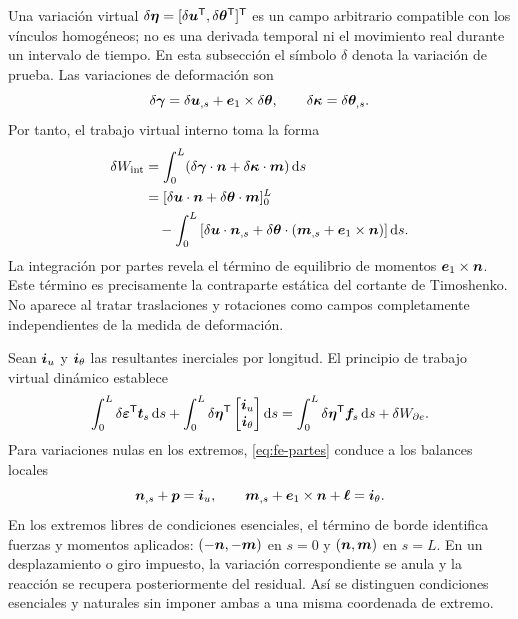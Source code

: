 Una variación virtual $\delta\bm{\eta}=[\delta\bm{u}^{\mathsf T},
\delta\bm{\theta}^{\mathsf T}]^{\mathsf T}$ es un campo arbitrario compatible con los
vínculos homogéneos; no es una derivada temporal ni el movimiento real durante
un intervalo de tiempo. En esta subsección el símbolo $\delta$ denota la
variación de prueba. Las variaciones de deformación son
\begin{equation}
 \delta\bm{\gamma}=\delta\bm{u}_{,s}
 +\bm{e}_1\times\delta\bm{\theta},
 \qquad
 \delta\bm{\kappa}=\delta\bm{\theta}_{,s}.
\end{equation}
Por tanto, el trabajo virtual interno toma la forma
\begin{align}
 \delta W_{\rm int}
 &=\int_0^L(\delta\bm{\gamma}\cdot\bm{n}
       +\delta\bm{\kappa}\cdot\bm{m})\,\mathrm d s\nonumber\\
 &=[\delta\bm{u}\cdot\bm{n}+
       \delta\bm{\theta}\cdot\bm{m}]_0^L\nonumber\\
 &\quad-\int_0^L\left[\delta\bm{u}\cdot\bm{n}_{,s}
       +\delta\bm{\theta}\cdot
       (\bm{m}_{,s}+\bm{e}_1\times\bm{n})\right]\mathrm d s.
 \label{eq:fe-partes}
\end{align}
La integración por partes revela el término de equilibrio de momentos
$\bm{e}_1\times\bm{n}$. Este término es precisamente la contraparte estática
del cortante de Timoshenko. No aparece al tratar traslaciones y rotaciones
como campos completamente independientes de la medida de deformación.

Sean $\bm{i}_u$ y $\bm{i}_\theta$ las resultantes inerciales por longitud.
El principio de trabajo virtual dinámico establece
\begin{equation}
 \int_0^L\delta\bm{\varepsilon}^{\mathsf T}\bm{t}_s\,\mathrm d s
 +\int_0^L\delta\bm{\eta}^{\mathsf T}
        \begin{bmatrix}\bm{i}_u\\\bm{i}_\theta\end{bmatrix}\mathrm d s
 =\int_0^L\delta\bm{\eta}^{\mathsf T}\bm{f}_s\,\mathrm d s
 +\delta W_{\partial e}.
 \label{eq:fe-debil}
\end{equation}
Para variaciones nulas en los extremos, \eqref{eq:fe-partes} conduce a los
balances locales
\begin{equation}
 \bm{n}_{,s}+\bm{p}=\bm{i}_u,\qquad
 \bm{m}_{,s}+\bm{e}_1\times\bm{n}+\bm{\ell}=\bm{i}_\theta.
\end{equation}
En los extremos libres de condiciones esenciales, el término de borde
identifica fuerzas y momentos aplicados: $(-\bm{n},-\bm{m})$ en $s=0$ y
$(\bm{n},\bm{m})$ en $s=L$. En un desplazamiento o giro impuesto, la variación
correspondiente se anula y la reacción se recupera posteriormente del
residual. Así se distinguen condiciones esenciales y naturales sin imponer
ambas a una misma coordenada de extremo.

